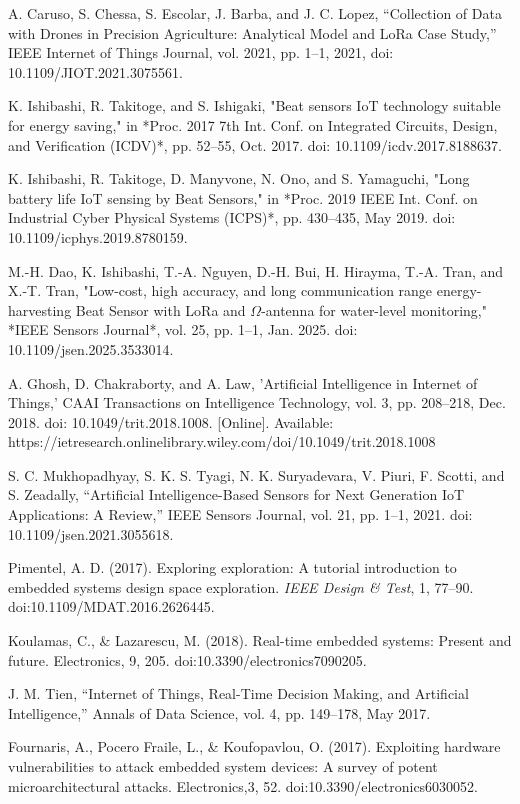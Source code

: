 \begin{thebibliography}{00}
 A. Caruso, S. Chessa, S. Escolar, J. Barba, and J. C. Lopez, “Collection of Data with Drones in Precision Agriculture: Analytical Model and LoRa Case Study,” IEEE Internet of Things Journal, vol. 2021, pp. 1–1, 2021, doi: 10.1109/JIOT.2021.3075561.

K. Ishibashi, R. Takitoge, and S. Ishigaki, 
"Beat sensors IoT technology suitable for energy saving," 
in *Proc. 2017 7th Int. Conf. on Integrated Circuits, Design, and Verification (ICDV)*, pp. 52--55, Oct. 2017. doi: 10.1109/icdv.2017.8188637.

K. Ishibashi, R. Takitoge, D. Manyvone, N. Ono, and S. Yamaguchi, 
"Long battery life IoT sensing by Beat Sensors," 
in *Proc. 2019 IEEE Int. Conf. on Industrial Cyber Physical Systems (ICPS)*, pp. 430--435, May 2019. doi: 10.1109/icphys.2019.8780159.

M.-H. Dao, K. Ishibashi, T.-A. Nguyen, D.-H. Bui, H. Hirayma, T.-A. Tran, and X.-T. Tran, 
"Low-cost, high accuracy, and long communication range energy-harvesting Beat Sensor with LoRa and $\Omega$-antenna for water-level monitoring,"
*IEEE Sensors Journal*, vol. 25, pp. 1--1, Jan. 2025. doi: 10.1109/jsen.2025.3533014.

 A. Ghosh, D. Chakraborty, and A. Law, 
'Artificial Intelligence in Internet of Things,' 
CAAI Transactions on Intelligence Technology, vol. 3, pp. 208--218, Dec. 2018. doi: 10.1049/trit.2018.1008. [Online]. Available: https://ietresearch.onlinelibrary.wiley.com/doi/10.1049/trit.2018.1008

 S. C. Mukhopadhyay, S. K. S. Tyagi, N. K. Suryadevara, V. Piuri, F. Scotti, and S. Zeadally, 
``Artificial Intelligence-Based Sensors for Next Generation IoT Applications: A Review,'' 
IEEE Sensors Journal, vol. 21, pp. 1--1, 2021. doi: 10.1109/jsen.2021.3055618.

Pimentel, A. D. (2017). Exploring exploration: A tutorial introduction to embedded systems design space exploration. \textit{IEEE Design \& Test}, 1, 77--90. doi:10.1109/MDAT.2016.2626445.

Koulamas, C., \& Lazarescu, M. (2018). Real-time embedded systems: Present and future. Electronics, 9, 205. doi:10.3390/electronics7090205.

 J. M. Tien, 
``Internet of Things, Real-Time Decision Making, and Artificial Intelligence,'' 
Annals of Data Science, vol. 4, pp. 149--178, May 2017.

Fournaris, A., Pocero Fraile, L., \& Koufopavlou, O. (2017). Exploiting hardware vulnerabilities to attack embedded system devices: A survey of potent microarchitectural attacks. Electronics,3, 52. doi:10.3390/electronics6030052.


\end{thebibliography}

